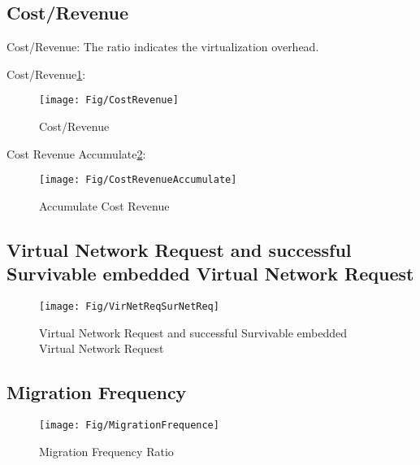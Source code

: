 \subsection{Cost/Revenue}
Cost/Revenue: The ratio indicates the virtualization overhead.

Cost/Revenue\ref{fig:CostRevenue}:
\begin{figure}
  \centering
  \texttt{[image: Fig/CostRevenue]}\\
  \caption{Cost/Revenue}\label{fig:CostRevenue}
\end{figure}

Cost Revenue Accumulate\ref{fig:CostRevenueAccumulate}:
\begin{figure}
  \centering
  \texttt{[image: Fig/CostRevenueAccumulate]}\\
  \caption{Accumulate Cost Revenue}\label{fig:CostRevenueAccumulate}
\end{figure}

\subsection{Virtual Network Request and successful Survivable embedded Virtual Network Request}
\begin{figure}
  \centering
  \texttt{[image: Fig/VirNetReqSurNetReq]}\\
  \caption{Virtual Network Request and successful Survivable embedded Virtual Network Request}\label{fig:VirNetReqSurNetReq}
\end{figure}

\subsection{Migration Frequency}
\begin{figure}
  \centering
  \texttt{[image: Fig/MigrationFrequence]}\\
  \caption{Migration Frequency Ratio}\label{fig:MigrationFrequence}
\end{figure}


